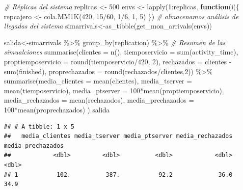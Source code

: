 \documentclass[
]{book}
\newenvironment{Shaded}{\begin{snugshade}}{\end{snugshade}}
\newcommand{\AttributeTok}[1]{\textcolor[rgb]{0.77,0.63,0.00}{#1}}
\newcommand{\CommentTok}[1]{\textcolor[rgb]{0.56,0.35,0.01}{\textit{#1}}}
\newcommand{\ControlFlowTok}[1]{\textcolor[rgb]{0.13,0.29,0.53}{\textbf{#1}}}
\newcommand{\DecValTok}[1]{\textcolor[rgb]{0.00,0.00,0.81}{#1}}
\newcommand{\FunctionTok}[1]{\textcolor[rgb]{0.00,0.00,0.00}{#1}}
\newcommand{\NormalTok}[1]{#1}
\newcommand{\OtherTok}[1]{\textcolor[rgb]{0.56,0.35,0.01}{#1}}
\newcommand{\SpecialCharTok}[1]{\textcolor[rgb]{0.00,0.00,0.00}{#1}}
\theoremstyle{definition}
\theoremstyle{definition}
\theoremstyle{definition}
\theoremstyle{definition}
\theoremstyle{remark}
\begin{document}
\begin{Shaded}
\begin{Highlighting}[]
\CommentTok{\# Réplicas del sistema}
\NormalTok{replicas }\OtherTok{\textless{}{-}} \DecValTok{500}
\NormalTok{envs }\OtherTok{\textless{}{-}} \FunctionTok{lapply}\NormalTok{(}\DecValTok{1}\SpecialCharTok{:}\NormalTok{replicas, }\ControlFlowTok{function}\NormalTok{(i)\{}
\NormalTok{  repcajero }\OtherTok{\textless{}{-}} \FunctionTok{cola.MM1K}\NormalTok{(}\DecValTok{420}\NormalTok{, }\DecValTok{15}\SpecialCharTok{/}\DecValTok{60}\NormalTok{, }\DecValTok{1}\SpecialCharTok{/}\DecValTok{6}\NormalTok{, }\DecValTok{1}\NormalTok{, }\DecValTok{5}\NormalTok{)}
\NormalTok{\})}
\CommentTok{\# almacenamos análisis de llegadas del sistema}
\NormalTok{simarrivals}\OtherTok{\textless{}{-}}\FunctionTok{as\_tibble}\NormalTok{(}\FunctionTok{get\_mon\_arrivals}\NormalTok{(envs))}

\NormalTok{salida}\OtherTok{\textless{}{-}}\NormalTok{simarrivals }\SpecialCharTok{\%\textgreater{}\%} 
  \FunctionTok{group\_by}\NormalTok{(replication) }\SpecialCharTok{\%\textgreater{}\%} 
  \CommentTok{\# Resumen de las simualciones}
  \FunctionTok{summarise}\NormalTok{(}\AttributeTok{clientes =} \FunctionTok{n}\NormalTok{(), }
            \AttributeTok{tiemposervicio =} \FunctionTok{sum}\NormalTok{(activity\_time),}
            \AttributeTok{proptiemposervicio =} \FunctionTok{round}\NormalTok{(tiemposervicio}\SpecialCharTok{/}\DecValTok{420}\NormalTok{, }\DecValTok{2}\NormalTok{),}
            \AttributeTok{rechazados =}\NormalTok{ clientes }\SpecialCharTok{{-}} \FunctionTok{sum}\NormalTok{(finished),}
            \AttributeTok{proprechazados =} \FunctionTok{round}\NormalTok{(rechazados}\SpecialCharTok{/}\NormalTok{clientes,}\DecValTok{2}\NormalTok{)) }\SpecialCharTok{\%\textgreater{}\%} 
  \FunctionTok{summarise}\NormalTok{(}\AttributeTok{media\_clientes =} \FunctionTok{mean}\NormalTok{(clientes),}
            \AttributeTok{media\_tserver =} \FunctionTok{mean}\NormalTok{(tiemposervicio),}
            \AttributeTok{media\_ptserver =} \DecValTok{100}\SpecialCharTok{*}\FunctionTok{mean}\NormalTok{(proptiemposervicio),}
            \AttributeTok{media\_rechazados =} \FunctionTok{mean}\NormalTok{(rechazados),}
            \AttributeTok{media\_prechazados =} \DecValTok{100}\SpecialCharTok{*}\FunctionTok{mean}\NormalTok{(proprechazados)}
\NormalTok{            )}
\NormalTok{salida}
\end{Highlighting}
\end{Shaded}

\begin{verbatim}
## # A tibble: 1 x 5
##   media_clientes media_tserver media_ptserver media_rechazados media_prechazados
##            <dbl>         <dbl>          <dbl>            <dbl>             <dbl>
## 1           102.          387.           92.2             36.0              34.9
\end{verbatim}
\end{document}
